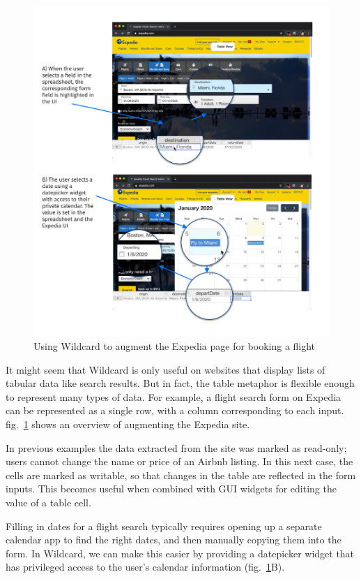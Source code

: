 \documentclass[english,submission]{programming}
\begin{document}
\begin{figure}
\hypertarget{fig:expedia-demo}{%
\centering
\includegraphics{media/expedia-demo-300dpi.png}
\caption{Using Wildcard to augment the Expedia page for booking a
flight}\label{fig:expedia-demo}
}
\end{figure}

It might seem that Wildcard is only useful on websites that display
lists of tabular data like search results. But in fact, the table
metaphor is flexible enough to represent many types of data. For
example, a flight search form on Expedia can be represented as a single
row, with a column corresponding to each input. {
fig.~\ref{fig:expedia-demo} shows an overview of augmenting the Expedia
site.}

In previous examples the data extracted from the site was marked as
read-only; users cannot change the name or price of an Airbnb listing.
In this next case, the cells are marked as writable, so that changes in
the table are reflected in the form inputs. This becomes useful when
combined with GUI widgets for editing the value of a table cell.

Filling in dates for a flight search typically requires opening up a
separate calendar app to find the right dates, and then manually copying
them into the form. In Wildcard, we can make this easier by providing a
datepicker widget that has privileged access to the user's calendar
information{ (fig.~\ref{fig:expedia-demo}B)}.
\end{document}
